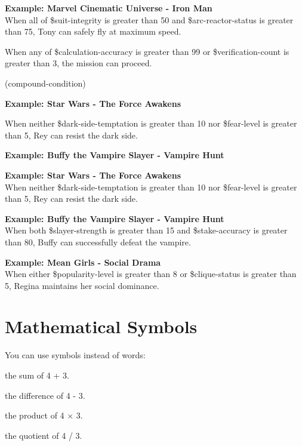 \documentclass[11pt,letterpaper,oldstylefigures]{memoir}
\newcommand{\stagedir}[1]{#1\par\vspace{1\baselineskip}}
\newenvironment{FountainExample}
  {\begingroup
  \ttfamily\small
   \setlength{\parindent}{0pt}
  \setlength{\parskip}{0.5em}
  \allowdisplaybreaks
  \setlength{\displaywidowpenalty}{0}
  \setlength{\widowpenalty}{0}
  \setlength{\clubpenalty}{0}
  \setlength{\interlinepenalty}{0}
}
  {\endgroup}
\begin{document}
\textbf{Example: Marvel Cinematic Universe - Iron Man}\\
When all of \$suit-integrity is greater than 50 and \$arc-reactor-status is greater than 75, Tony can safely fly at maximum speed.

\begin{FountainExample}
\stagedir{When any of \$calculation-accuracy is greater than 99 or \$verification-count is greater than 3, the mission can proceed.} (\gls{compound-condition})
\end{FountainExample}

\textbf{Example: Star Wars - The Force Awakens}

\begin{FountainExample}
\stagedir{When neither \$dark-side-temptation is greater than 10 nor \$fear-level is greater than 5, Rey can resist the dark side.}
\end{FountainExample}

\textbf{Example: Buffy the Vampire Slayer - Vampire Hunt}

\textbf{Example: Star Wars - The Force Awakens}\\
When neither \$dark-side-temptation is greater than 10 nor \$fear-level is greater than 5, Rey can resist the dark side.

\textbf{Example: Buffy the Vampire Slayer - Vampire Hunt}\\
When both \$slayer-strength is greater than 15 and \$stake-accuracy is greater than 80, Buffy can successfully defeat the vampire.

\textbf{Example: Mean Girls - Social Drama}\\
When either \$popularity-level is greater than 8 or \$clique-status is greater than 5, Regina maintains her social dominance.

\section{Mathematical Symbols}

You can use symbols instead of words:

\begin{FountainExample}
\stagedir{the sum of 4 + 3.}
\end{FountainExample}

\begin{FountainExample}
\stagedir{the difference of 4 - 3.}
\end{FountainExample}

\begin{FountainExample}
\stagedir{the product of 4 × 3.}
\end{FountainExample}
\begin{FountainExample}
\stagedir{the quotient of 4 / 3.}
\end{FountainExample}
\end{document}
